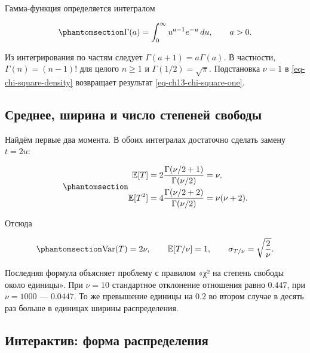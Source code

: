\documentclass[
  russian,
  11pt,
  a4paper,
  open=any]{scrbook}
\begin{document}
Гамма-функция определяется интегралом

\begin{equation}\protect\phantomsection\label{eq-ch13-gamma-function}{
\Gamma(a)=\int_0^\infty u^{a-1}e^{-u}\,du,
\qquad a>0.
}\end{equation}

Из интегрирования по частям следует \(\Gamma(a+1)=a\Gamma(a)\). В
частности, \(\Gamma(n)=(n-1)!\) для целого \(n\ge1\) и
\(\Gamma(1/2)=\sqrt\pi\). Подстановка \(\nu=1\) в
\ref{eq-chi-square-density} возвращает результат
\ref{eq-ch13-chi-square-one}.

\subsection{Среднее, ширина и число степеней
свободы}\label{ux441ux440ux435ux434ux43dux435ux435-ux448ux438ux440ux438ux43dux430-ux438-ux447ux438ux441ux43bux43e-ux441ux442ux435ux43fux435ux43dux435ux439-ux441ux432ux43eux431ux43eux434ux44b}

Найдём первые два момента. В обоих интегралах достаточно сделать замену
\(t=2u\):

\begin{equation}\protect\phantomsection\label{eq-ch13-chi-square-moments}{
\begin{aligned}
\mathbb E[T]
&=2\frac{\Gamma(\nu/2+1)}{\Gamma(\nu/2)}=\nu,\\
\mathbb E[T^2]
&=4\frac{\Gamma(\nu/2+2)}{\Gamma(\nu/2)}=\nu(\nu+2).
\end{aligned}
}\end{equation}

Отсюда

\begin{equation}\protect\phantomsection\label{eq-ch13-reduced-chi-square-width}{
\operatorname{Var}(T)=2\nu,
\qquad
\mathbb E[T/\nu]=1,
\qquad
\sigma_{T/\nu}=\sqrt{\frac{2}{\nu}}.
}\end{equation}

Последняя формула объясняет проблему с правилом «χ² на степень свободы
около единицы». При \(\nu=10\) стандартное отклонение отношения равно
\(0.447\), при \(\nu=1000\) --- \(0.0447\). То же превышение единицы на
\(0.2\) во втором случае в десять раз больше в единицах ширины
распределения.

\subsection{Интерактив: форма
распределения}\label{interactive-goodness-chi2-shape}
\end{document}
